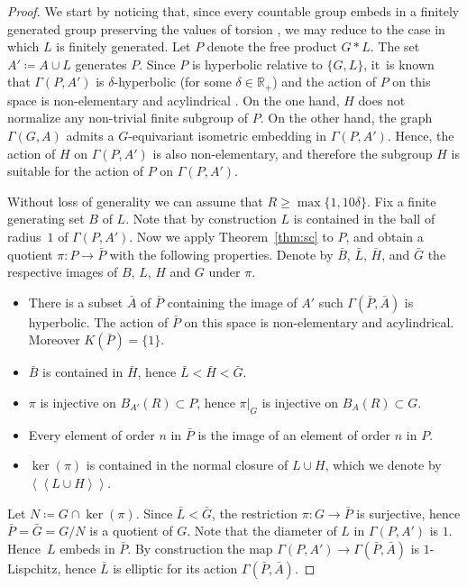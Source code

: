 \documentclass[11pt]{article}
\theoremstyle{definition}
\newcommand{\normal}[1]{\left<\! \left< #1\right> \!\right>}
\begin{document}
\begin{proof}
We start by noticing that, since every countable group embeds in a finitely generated group preserving the values of torsion \cite[Th.\,IV.3.1]{Lyndon:2001wm}, we may reduce to the case in which $L$ is finitely generated.
Let $P$ denote the free product $G \ast L$.
The set $A' \coloneqq A \cup L$ generates $P$.
Since $P$ is hyperbolic relative to $\{G,L\}$, it~is known that $\Gamma(P,A')$ is $\delta$-hyperbolic (for some $\delta \in \mathbb R_+$) and the action of $P$ on this space is non-elementary and acylindrical \cite[Th.\,2.7]{Abbott:2019aa}.
On the one hand, $H$ does not normalize any non-trivial finite subgroup of $P$.
On the other hand, the graph $\Gamma(G,A)$ admits a $G$-equivariant isometric embedding in $\Gamma(P,A')$.
Hence, the action of $H$ on $\Gamma(P, A')$ is also non-elementary, and therefore the subgroup $H$ is suitable for the action of $P$ on $\Gamma(P,A')$. 

Without loss of generality we can assume that $R \geq \max\{ 1, 10\delta\}$.
Fix a finite generating set $B$ of $L$.
Note that by construction $L$ is contained in the ball of radius~$1$ of $\Gamma(P, A')$.
Now we apply Theorem~\ref{thm:sc} to $P$, and obtain a quotient $\pi : P \to \bar{P}$ with the following properties.
Denote by $\bar B$, $\bar L$, $\bar H$, and $\bar G$ the respective images of $B$, $L$, $H$ and $G$ under $\pi$.
\begin{itemize}
\item There is a subset $\bar A$ of $\bar P$ containing the image of $A'$ such $\Gamma(\bar P, \bar A)$ is hyperbolic.
The action of $\bar P$ on this space is non-elementary and acylindrical.
Moreover \hbox{$K(\bar P) = \{1\}$}.
\item $\bar B$ is contained in $\bar H$, hence $\bar L < \bar H < \bar G$.
\item $\pi$ is injective on $B_{A'}(R) \subset P$, hence $\pi|_G$ is injective on $B_A(R) \subset G$.
\item Every element of order $n$ in $\bar{P}$ is the image of an element of order $n$ in $P$.
\item $\ker(\pi)$ is contained in the normal closure of $L\cup H$, which we denote by $\normal{L\cup H}$.
\end{itemize}
Let $N \coloneqq G \cap \ker(\pi)$.
Since $\bar L < \bar G$, the restriction $\pi : G \to \bar P$ is surjective, hence $\bar P = \bar G = G/N$ is a quotient of $G$.
Note that the diameter of $L$ in $\Gamma(P,A')$ is $1$.
Hence~$L$ embeds in $\bar P$.
By construction the map $\Gamma(P, A') \to \Gamma(\bar P, \bar A)$ is $1$-Lispchitz, hence $\bar L$ is elliptic for its action $\Gamma(\bar P, \bar A)$.


\end{proof}
\end{document}
